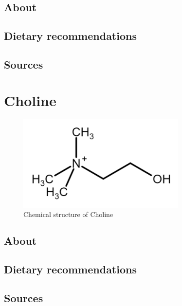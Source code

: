 \documentclass{book}
\begin{document}
\begin{sloppypar}
\section{About}


\section{Dietary recommendations}


\section{Sources}


\chapter{Choline}
\begin{figure}[h]
	\caption{Chemical structure of Choline}
	\centering \includegraphics[width=0.75\textwidth]{images/Choline_chemical_structure}
\end{figure}
\newpage

\section{About}


\section{Dietary recommendations}


\section{Sources}
\end{sloppypar}


\listoffigures


\listoftables
\end{document}
